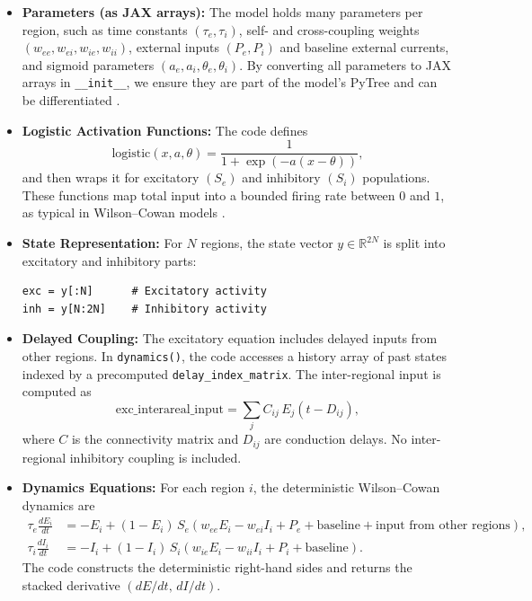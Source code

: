 \documentclass[11pt,a4paper]{article}
\begin{document}
\begin{itemize}

\item \textbf{Parameters (as JAX arrays):}
The model holds many parameters per region, such as time constants
$(\tau_e, \tau_i)$, self- and cross-coupling weights
$(w_{ee}, w_{ei}, w_{ie}, w_{ii})$, external inputs $(P_e, P_i)$ and baseline
external currents, and sigmoid parameters
$(a_e, a_i, \theta_e, \theta_i)$.
By converting all parameters to JAX arrays in \texttt{\_\_init\_\_}, we ensure they
are part of the model’s PyTree and can be differentiated \cite{kidger2021equinox}.

\item \textbf{Logistic Activation Functions:}
The code defines
\[
\text{logistic}(x, a, \theta) = \frac{1}{1 + \exp\!\left(-a(x - \theta)\right)},
\]
and then wraps it for excitatory $(S_e)$ and inhibitory $(S_i)$ populations.
These functions map total input into a bounded firing rate between $0$ and $1$,
as typical in Wilson--Cowan models \cite{wilson1972excitatory,wilson1973dynamics}.

\item \textbf{State Representation:}
For $N$ regions, the state vector $y \in \mathbb{R}^{2N}$ is split into
excitatory and inhibitory parts:
\begin{verbatim}
exc = y[:N]      # Excitatory activity
inh = y[N:2N]    # Inhibitory activity
\end{verbatim}

\item \textbf{Delayed Coupling:}
The excitatory equation includes delayed inputs from other regions.
In \texttt{dynamics()}, the code accesses a history array of past states indexed
by a precomputed \texttt{delay\_index\_matrix}.  
The inter-regional input is computed as
\[
\text{exc\_interareal\_input}
= \sum_j C_{ij} \, E_j(t - D_{ij}),
\]
where $C$ is the connectivity matrix and $D_{ij}$ are conduction delays.
No inter-regional inhibitory coupling is included.

\item \textbf{Dynamics Equations:}
For each region $i$, the deterministic Wilson--Cowan dynamics are
\begin{align}
\tau_e \frac{dE_i}{dt} &= -E_i
+ (1 - E_i)\,
S_e\!\left(w_{ee} E_i - w_{ei} I_i + P_e + \text{baseline}
+ \text{input from other regions}\right), \\
\tau_i \frac{dI_i}{dt} &= -I_i
+ (1 - I_i)\,
S_i\!\left(w_{ie} E_i - w_{ii} I_i + P_i + \text{baseline}\right).
\end{align}
The code constructs the deterministic right-hand sides and returns the stacked
derivative $(dE/dt,\, dI/dt)$.


\end{itemize}
\end{document}
